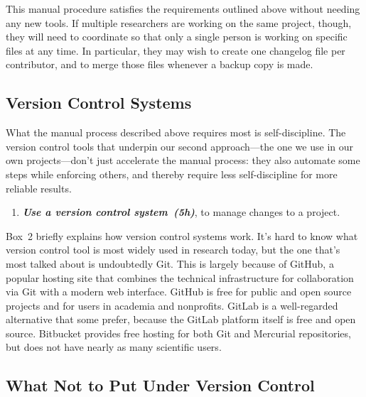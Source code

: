 \documentclass[10pt,letterpaper]{article}
\newcommand{\withurl}[2]{{#1}}
\newcommand{\practice}[2]{\textbf{\emph{{#2}~({#1})}}}
\begin{document}
This manual procedure satisfies the requirements outlined above
without needing any new tools. If multiple researchers are working on
the same project, though, they will need to coordinate so that only a
single person is working on specific files at any time. In particular,
they may wish to create one changelog file per contributor, and to
merge those files whenever a backup copy is made.

\subsection*{Version Control Systems}

What the manual process described above requires most is
self-discipline. The version control tools that underpin our second
approach---the one we use in our own projects---don't just accelerate
the manual process: they also automate some steps while enforcing
others, and thereby require less self-discipline for more reliable
results.

\begin{enumerate}

\item

  \practice{5h}{Use a version control system}, to manage changes to a
  project.

\end{enumerate}

Box~2 briefly explains how version control systems work.  It's hard to
know what version control tool is most widely used in research today,
but the one that's most talked about is undoubtedly
\withurl{Git}{https://git-scm.com/}. This is largely because of
\withurl{GitHub}{http://github.com}, a popular hosting site that
combines the technical infrastructure for collaboration via Git with a
modern web interface. GitHub is free for public and open source
projects and for users in academia and nonprofits.
\withurl{GitLab}{https://about.gitlab.com} is a well-regarded
alternative that some prefer, because the GitLab platform itself is
free and open source. \withurl{Bitbucket}{https://bitbucket.org/}
provides free hosting for both Git and Mercurial repositories, but
does not have nearly as many scientific users.

\subsection*{What Not to Put Under Version Control}
\end{document}
